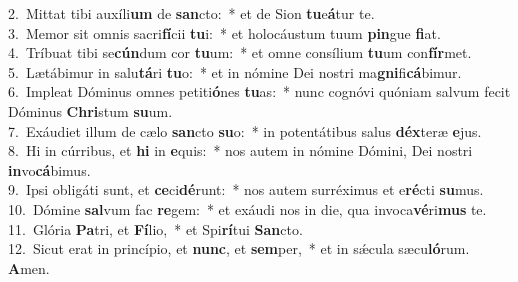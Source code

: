 {2.~}Mittat tibi auxíli\textbf{um} de \textbf{san}cto:~* et de Sion \textbf{tu}e\textbf{á}tur te.\\
{3.~}Memor sit omnis sacri\textbf{fí}cii \textbf{tu}i:~* et holocáustum tuum \textbf{pin}gue \textbf{fi}at.\\
{4.~}Tríbuat tibi se\textbf{cún}dum cor \textbf{tu}um:~* et omne consílium \textbf{tu}um con\textbf{fír}met.\\
{5.~}Lætábimur in salu\textbf{tá}ri \textbf{tu}o:~* et in nómine Dei nostri ma\textbf{gni}fi\textbf{cá}bimur.\\
{6.~}Impleat Dóminus omnes petiti\textbf{ó}nes \textbf{tu}as:~* nunc cognóvi quóniam salvum fecit Dóminus \textbf{Chri}stum \textbf{su}um.\\
{7.~}Exáudiet illum de cælo \textbf{san}cto \textbf{su}o:~* in potentátibus salus \textbf{déx}teræ \textbf{e}jus.\\
{8.~}Hi in cúrribus, et \textbf{hi} in \textbf{e}quis:~* nos autem in nómine Dómini, Dei nostri \textbf{in}vo\textbf{cá}bimus.\\
{9.~}Ipsi obligáti sunt, et \textbf{ce}ci\textbf{dé}runt:~* nos autem surréximus et e\textbf{ré}cti \textbf{su}mus.\\
{10.~}Dómine \textbf{sal}vum fac \textbf{re}gem:~* et exáudi nos in die, qua invoca\textbf{vé}ri\textbf{mus} te.\\
{11.~}Glória \textbf{Pa}tri, et \textbf{Fí}lio,~* et Spi\textbf{rí}tui \textbf{San}cto.\\
{12.~}Sicut erat in princípio, et \textbf{nunc}, et \textbf{sem}per,~* et in sǽcula sæcu\textbf{ló}rum. \textbf{A}men.\\
